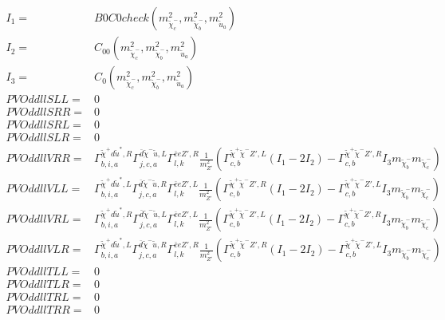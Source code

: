 \documentclass[A4,landscape]{article}
\begin{document}
\begin{align} 
I_1= & B0C0check(m^2_{\tilde{\chi}^-_{{c}}}, m^2_{\tilde{\chi}^-_{{b}}}, m^2_{\tilde{u}_{{a}}}) \\ 
I_2= & C_{00}(m^2_{\tilde{\chi}^-_{{c}}}, m^2_{\tilde{\chi}^-_{{b}}}, m^2_{\tilde{u}_{{a}}}) \\ 
I_3= & C_0(m^2_{\tilde{\chi}^-_{{c}}}, m^2_{\tilde{\chi}^-_{{b}}}, m^2_{\tilde{u}_{{a}}}) \\ 
  PVOddllSLL= & 0 \\ 
  PVOddllSRR= & 0 \\ 
  PVOddllSRL= & 0 \\ 
  PVOddllSLR= & 0 \\ 
  PVOddllVRR= &  \Gamma^{\tilde{\chi}^+d \tilde{u}^*,R}_{b, i, a} \Gamma^{\bar{d}\tilde{\chi}^- \tilde{u} ,L}_{j, c, a} \Gamma^{\bar{e}e {Z'} ,R}_{l, k} \frac{1}{m^2_{{Z'}}} (\Gamma^{\tilde{\chi}^+\tilde{\chi}^- {Z'} ,L}_{c, b} (I_1 - 2 I_2) - \Gamma^{\tilde{\chi}^+\tilde{\chi}^- {Z'} ,R}_{c, b} I_3 m_{\tilde{\chi}^-_{{b}}} m_{\tilde{\chi}^-_{{c}}}) \\ 
  PVOddllVLL= &  \Gamma^{\tilde{\chi}^+d \tilde{u}^*,L}_{b, i, a} \Gamma^{\bar{d}\tilde{\chi}^- \tilde{u} ,R}_{j, c, a} \Gamma^{\bar{e}e {Z'} ,L}_{l, k} \frac{1}{m^2_{{Z'}}} (\Gamma^{\tilde{\chi}^+\tilde{\chi}^- {Z'} ,R}_{c, b} (I_1 - 2 I_2) - \Gamma^{\tilde{\chi}^+\tilde{\chi}^- {Z'} ,L}_{c, b} I_3 m_{\tilde{\chi}^-_{{b}}} m_{\tilde{\chi}^-_{{c}}}) \\ 
  PVOddllVRL= &  \Gamma^{\tilde{\chi}^+d \tilde{u}^*,R}_{b, i, a} \Gamma^{\bar{d}\tilde{\chi}^- \tilde{u} ,L}_{j, c, a} \Gamma^{\bar{e}e {Z'} ,L}_{l, k} \frac{1}{m^2_{{Z'}}} (\Gamma^{\tilde{\chi}^+\tilde{\chi}^- {Z'} ,L}_{c, b} (I_1 - 2 I_2) - \Gamma^{\tilde{\chi}^+\tilde{\chi}^- {Z'} ,R}_{c, b} I_3 m_{\tilde{\chi}^-_{{b}}} m_{\tilde{\chi}^-_{{c}}}) \\ 
  PVOddllVLR= &  \Gamma^{\tilde{\chi}^+d \tilde{u}^*,L}_{b, i, a} \Gamma^{\bar{d}\tilde{\chi}^- \tilde{u} ,R}_{j, c, a} \Gamma^{\bar{e}e {Z'} ,R}_{l, k} \frac{1}{m^2_{{Z'}}} (\Gamma^{\tilde{\chi}^+\tilde{\chi}^- {Z'} ,R}_{c, b} (I_1 - 2 I_2) - \Gamma^{\tilde{\chi}^+\tilde{\chi}^- {Z'} ,L}_{c, b} I_3 m_{\tilde{\chi}^-_{{b}}} m_{\tilde{\chi}^-_{{c}}}) \\ 
  PVOddllTLL= & 0 \\ 
  PVOddllTLR= & 0 \\ 
  PVOddllTRL= & 0 \\ 
  PVOddllTRR= & 0 \\ 
\end{align} 
\end{document}
